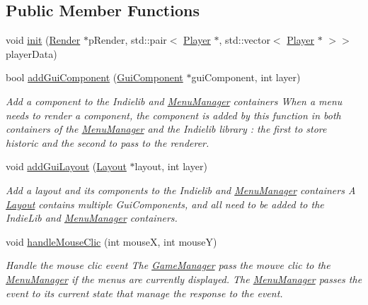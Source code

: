 \subsection*{Public Member Functions}
\begin{DoxyCompactItemize}
\item 
void \hyperlink{class_symp_1_1_menu_manager_aab6441e17669df816e59689cc8abf9d9}{init} (\hyperlink{class_symp_1_1_render}{Render} $\ast$p\-Render, std\-::pair$<$ \hyperlink{class_symp_1_1_player}{Player} $\ast$, std\-::vector$<$ \hyperlink{class_symp_1_1_player}{Player} $\ast$ $>$$>$ player\-Data)
\item 
bool \hyperlink{class_symp_1_1_menu_manager_a76a689b279833c2b6f8605fc091d6889}{add\-Gui\-Component} (\hyperlink{class_symp_1_1_gui_component}{Gui\-Component} $\ast$gui\-Component, int layer)
\begin{DoxyCompactList}\small\item\em Add a component to the Indielib and \hyperlink{class_symp_1_1_menu_manager}{Menu\-Manager} containers When a menu needs to render a component, the component is added by this function in both containers of the \hyperlink{class_symp_1_1_menu_manager}{Menu\-Manager} and the Indielib library \-: the first to store historic and the second to pass to the renderer. \end{DoxyCompactList}\item 
void \hyperlink{class_symp_1_1_menu_manager_ab5eb90e375b4832e284804d0e985afe9}{add\-Gui\-Layout} (\hyperlink{class_symp_1_1_layout}{Layout} $\ast$layout, int layer)
\begin{DoxyCompactList}\small\item\em Add a layout and its components to the Indielib and \hyperlink{class_symp_1_1_menu_manager}{Menu\-Manager} containers A \hyperlink{class_symp_1_1_layout}{Layout} contains multiple Gui\-Components, and all need to be added to the Indie\-Lib and \hyperlink{class_symp_1_1_menu_manager}{Menu\-Manager} containers. \end{DoxyCompactList}\item 
void \hyperlink{class_symp_1_1_menu_manager_ad72c273480039d17ebda3480311d4508}{handle\-Mouse\-Clic} (int mouse\-X, int mouse\-Y)
\begin{DoxyCompactList}\small\item\em Handle the mouse clic event The \hyperlink{class_symp_1_1_game_manager}{Game\-Manager} pass the mouve clic to the \hyperlink{class_symp_1_1_menu_manager}{Menu\-Manager} if the menus are currently displayed. The \hyperlink{class_symp_1_1_menu_manager}{Menu\-Manager} passes the event to its current state that manage the response to the event. \end{DoxyCompactList}\item 
$$
\end{DoxyCompactItemize}
